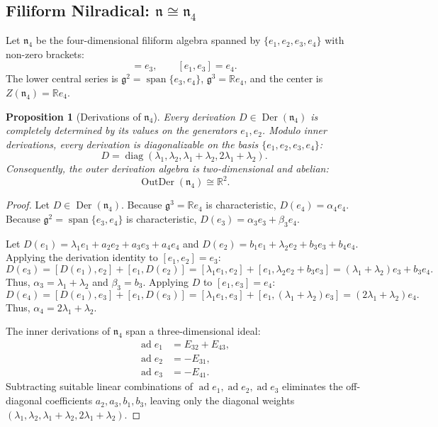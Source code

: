 \documentclass[11pt,a4paper]{article}
\newtheorem{proposition}[theorem]{Proposition}
\theoremstyle{definition}
\theoremstyle{remark}
\newcommand{\R}{\mathbb{R}}
\newcommand{\g}{\mathfrak{g}}
\newcommand{\n}{\mathfrak{n}}
\newcommand{\ad}{\operatorname{ad}}
\newcommand{\Der}{\operatorname{Der}}
\newcommand{\OutDer}{\operatorname{OutDer}}
\newcommand{\diag}{\operatorname{diag}}
\newcommand{\spanop}{\operatorname{span}}
\begin{document}
\subsection{Filiform Nilradical: $\n \cong \mathfrak{n}_4$}\label{subsec:N4}
Let $\mathfrak{n}_4$ be the four-dimensional filiform algebra spanned by $\{e_1, e_2, e_3, e_4\}$ with non-zero brackets:
\begin{equation}
    [e_1, e_2] = e_3, \qquad [e_1, e_3] = e_4.
\end{equation}
The lower central series is $\g^2 = \spanop\{e_3, e_4\}$, $\g^3 = \R e_4$, and the center is $Z(\mathfrak{n}_4) = \R e_4$.

\begin{proposition}[Derivations of $\mathfrak{n}_4$]\label{prop:der_n4}
Every derivation $D \in \Der(\mathfrak{n}_4)$ is completely determined by its values on the generators $e_1, e_2$. Modulo inner derivations, every derivation is diagonalizable on the basis $\{e_1, e_2, e_3, e_4\}$:
\begin{equation}
    D = \diag(\lambda_1, \lambda_2, \lambda_1 + \lambda_2, 2\lambda_1 + \lambda_2).
\end{equation}
Consequently, the outer derivation algebra is two-dimensional and abelian:
\begin{equation}
    \OutDer(\mathfrak{n}_4) \cong \R^2.
\end{equation}
\end{proposition}

\begin{proof}
Let $D \in \Der(\mathfrak{n}_4)$. Because $\g^3 = \R e_4$ is characteristic, $D(e_4) = \alpha_4 e_4$. Because $\g^2 = \spanop\{e_3, e_4\}$ is characteristic, $D(e_3) = \alpha_3 e_3 + \beta_3 e_4$. 

Let $D(e_1) = \lambda_1 e_1 + a_2 e_2 + a_3 e_3 + a_4 e_4$ and $D(e_2) = b_1 e_1 + \lambda_2 e_2 + b_3 e_3 + b_4 e_4$. Applying the derivation identity to $[e_1, e_2] = e_3$:
\begin{equation}
    D(e_3) = [D(e_1), e_2] + [e_1, D(e_2)] = [\lambda_1 e_1, e_2] + [e_1, \lambda_2 e_2 + b_3 e_3] = (\lambda_1 + \lambda_2)e_3 + b_3 e_4.
\end{equation}
Thus, $\alpha_3 = \lambda_1 + \lambda_2$ and $\beta_3 = b_3$. Applying $D$ to $[e_1, e_3] = e_4$:
\begin{equation}
    D(e_4) = [D(e_1), e_3] + [e_1, D(e_3)] = [\lambda_1 e_1, e_3] + [e_1, (\lambda_1 + \lambda_2)e_3] = (2\lambda_1 + \lambda_2)e_4.
\end{equation}
Thus, $\alpha_4 = 2\lambda_1 + \lambda_2$.

The inner derivations of $\mathfrak{n}_4$ span a three-dimensional ideal:
\begin{align}
    \ad e_1 &= E_{32} + E_{43}, \\
    \ad e_2 &= -E_{31}, \\
    \ad e_3 &= -E_{41}.
\end{align}
Subtracting suitable linear combinations of $\ad e_1, \ad e_2, \ad e_3$ eliminates the off-diagonal coefficients $a_2, a_3, b_1, b_3$, leaving only the diagonal weights $(\lambda_1, \lambda_2, \lambda_1 + \lambda_2, 2\lambda_1 + \lambda_2)$.
\end{proof}
\end{document}
